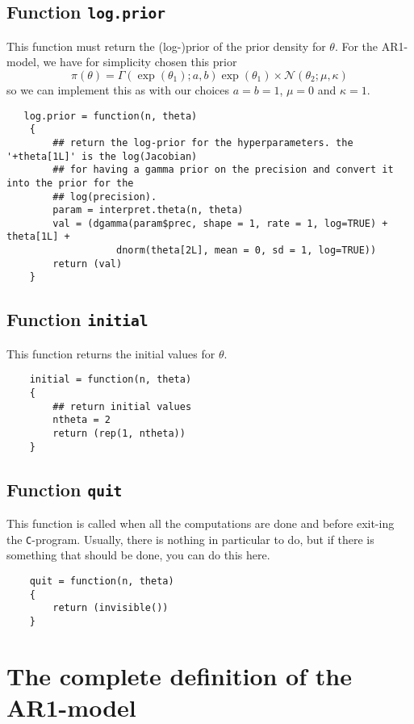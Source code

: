 \documentclass[a4paper,11pt]{article}
\begin{document}
\subsection*{Function \texttt{log.prior}}

This function must return the (log-)prior of the prior density for
$\theta$. For the AR1-model, we have for simplicity chosen this prior
\begin{displaymath}
    \pi(\theta) = \Gamma(\exp(\theta_1); a,b) \exp(\theta_1) \times
    {\mathcal N}(\theta_{2}; \mu, \kappa)
\end{displaymath}
so we can implement this as with our choices $a=b=1$, $\mu=0$ and
$\kappa=1$. 
{\small
\begin{verbatim}
   log.prior = function(n, theta)
    {
        ## return the log-prior for the hyperparameters. the '+theta[1L]' is the log(Jacobian)
        ## for having a gamma prior on the precision and convert it into the prior for the
        ## log(precision).
        param = interpret.theta(n, theta)
        val = (dgamma(param$prec, shape = 1, rate = 1, log=TRUE) + theta[1L] + 
                   dnorm(theta[2L], mean = 0, sd = 1, log=TRUE))
        return (val)
    }
\end{verbatim}
}


\subsection*{Function \texttt{initial}}

This function returns the initial values for $\theta$.
{\small
\begin{verbatim}
    initial = function(n, theta)
    {
        ## return initial values
        ntheta = 2
        return (rep(1, ntheta))
    }
\end{verbatim}
}

\subsection*{Function \texttt{quit}}

This function is called when all the computations are done and before
exit-ing the \texttt{C}-program. Usually, there is nothing in
particular to do, but if there is something that should be done, you
can do this here.
{\small
\begin{verbatim}
    quit = function(n, theta)
    {
        return (invisible())
    }
\end{verbatim}
}


\section*{The complete definition of the AR1-model}
\end{document}
